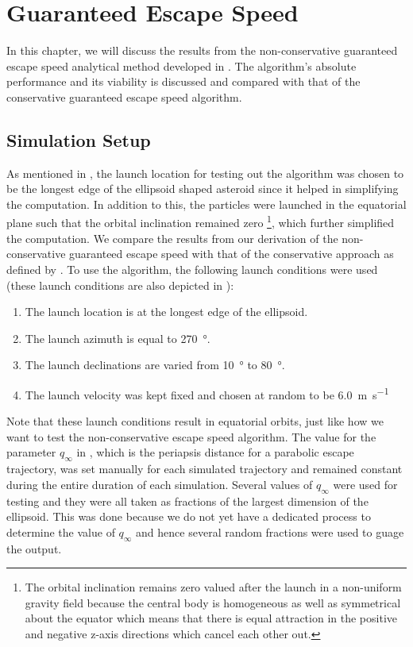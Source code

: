 \chapter{Guaranteed Escape Speed}
\label{chap:nonconservative}
\graphicspath{{Results/Images/}}

In this chapter, we will discuss the results from the non-conservative guaranteed escape speed analytical method developed in . The algorithm's absolute performance and its viability is discussed and compared with that of the conservative guaranteed escape speed algorithm.

\section{Simulation Setup}
\label{sec:nonconservative_simulation_setup}
As mentioned in , the launch location for testing out the algorithm was chosen to be the longest edge of the ellipsoid shaped asteroid since it helped in simplifying the computation. In addition to this, the particles were launched in the equatorial plane such that the orbital inclination remained zero \footnote{The orbital inclination remains zero valued after the launch in a non-uniform gravity field because the central body is homogeneous as well as symmetrical about the equator which means that there is equal attraction in the positive and negative z-axis directions which cancel each other out.}, which further simplified the computation.
%
\newline\newline
%
We compare the results from our derivation of the non-conservative guaranteed escape speed with that of the conservative approach as defined by \cite{scheeresBook}. To use the algorithm, the following launch conditions were used (these launch conditions are also depicted in ):
\begin{enumerate}
    \item The launch location is at the longest edge of the ellipsoid.
    \item The launch azimuth is equal to \SI{270}{\degree}.
    \item The launch declinations are varied from \SI{10}{\degree} to \SI{80}{\degree}.
    \item The launch velocity was kept fixed and chosen at random to be \SI{6.0}{\metre \per \second}
\end{enumerate}
Note that these launch conditions result in equatorial orbits, just like how we want to test the non-conservative escape speed algorithm. The value for the parameter $q_\infty$ in , which is the periapsis distance for a parabolic escape trajectory, was set manually for each simulated trajectory and remained constant during the entire duration of each simulation. Several values of $q_\infty$ were used for testing and they were all taken as fractions of the largest dimension of the ellipsoid. This was done because we do not yet have a dedicated process to determine the value of $q_\infty$ and hence several random fractions were used to guage the output.
